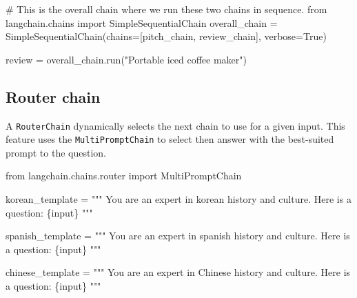 \documentclass[
  letterpaper,
  DIV=11,
  numbers=noendperiod]{scrreprt}
\newenvironment{Shaded}{\begin{snugshade}}{\end{snugshade}}
\newcommand{\CommentTok}[1]{\textcolor[rgb]{0.37,0.37,0.37}{#1}}
\newcommand{\ImportTok}[1]{\textcolor[rgb]{0.00,0.46,0.62}{#1}}
\newcommand{\NormalTok}[1]{\textcolor[rgb]{0.00,0.23,0.31}{#1}}
\newcommand{\OperatorTok}[1]{\textcolor[rgb]{0.37,0.37,0.37}{#1}}
\newcommand{\SpecialCharTok}[1]{\textcolor[rgb]{0.37,0.37,0.37}{#1}}
\newcommand{\StringTok}[1]{\textcolor[rgb]{0.13,0.47,0.30}{#1}}
\newcommand{\VariableTok}[1]{\textcolor[rgb]{0.07,0.07,0.07}{#1}}
\begin{document}
\begin{Shaded}
\begin{Highlighting}[]
\CommentTok{\# This is the overall chain where we run these two chains in sequence.}
\ImportTok{from}\NormalTok{ langchain.chains }\ImportTok{import}\NormalTok{ SimpleSequentialChain}
\NormalTok{overall\_chain }\OperatorTok{=}\NormalTok{ SimpleSequentialChain(chains}\OperatorTok{=}\NormalTok{[pitch\_chain, review\_chain], verbose}\OperatorTok{=}\VariableTok{True}\NormalTok{)}
\end{Highlighting}
\end{Shaded}

\begin{Shaded}
\begin{Highlighting}[]
\NormalTok{review }\OperatorTok{=}\NormalTok{ overall\_chain.run(}\StringTok{"Portable iced coffee maker"}\NormalTok{)}
\end{Highlighting}
\end{Shaded}

\hypertarget{router-chain}{%
\subsection{Router chain}\label{router-chain}}

A \texttt{RouterChain} dynamically selects the next chain to use for a
given input. This feature uses the \texttt{MultiPromptChain} to select
then answer with the best-suited prompt to the question.

\begin{Shaded}
\begin{Highlighting}[]
\ImportTok{from}\NormalTok{ langchain.chains.router }\ImportTok{import}\NormalTok{ MultiPromptChain}
\end{Highlighting}
\end{Shaded}

\begin{Shaded}
\begin{Highlighting}[]
\NormalTok{korean\_template }\OperatorTok{=} \StringTok{"""}
\StringTok{You are an expert in korean history and culture.}
\StringTok{Here is a question:}
\SpecialCharTok{\{input\}}
\StringTok{"""}

\NormalTok{spanish\_template }\OperatorTok{=} \StringTok{"""}
\StringTok{You are an expert in spanish history and culture.}
\StringTok{Here is a question:}
\SpecialCharTok{\{input\}}
\StringTok{"""}

\NormalTok{chinese\_template }\OperatorTok{=} \StringTok{"""}
\StringTok{You are an expert in Chinese history and culture.}
\StringTok{Here is a question:}
\SpecialCharTok{\{input\}}
\StringTok{"""}
\end{Highlighting}
\end{Shaded}
\end{document}
